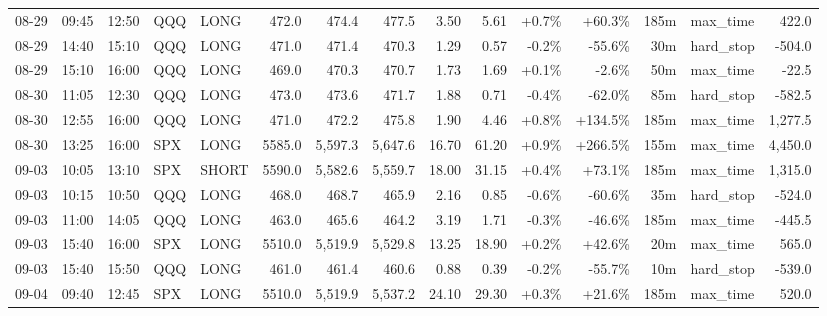 \documentclass[11pt,a4paper,twoside]{article}
\begin{document}
\begin{landscape}
\begin{center}
\begin{longtable}{>{\color{txtmain}}l l l l l r r r r r r r r >{\color{txtmain}}l r}
08-29 & 09:45 & 12:50 & QQQ & LONG & 472.0 & 474.4 & 477.5 & 3.50 & 5.61 & \textcolor{wingreen}{+0.7\%} & \textcolor{wingreen}{+60.3\%} & 185m & max\_time & \textcolor{wingreen}{422.0} \\
08-29 & 14:40 & 15:10 & QQQ & LONG & 471.0 & 471.4 & 470.3 & 1.29 & 0.57 & \textcolor{lossred}{-0.2\%} & \textcolor{lossred}{-55.6\%} & 30m & hard\_stop & \textcolor{lossred}{-504.0} \\
08-29 & 15:10 & 16:00 & QQQ & LONG & 469.0 & 470.3 & 470.7 & 1.73 & 1.69 & \textcolor{wingreen}{+0.1\%} & \textcolor{lossred}{-2.6\%} & 50m & max\_time & \textcolor{lossred}{-22.5} \\
08-30 & 11:05 & 12:30 & QQQ & LONG & 473.0 & 473.6 & 471.7 & 1.88 & 0.71 & \textcolor{lossred}{-0.4\%} & \textcolor{lossred}{-62.0\%} & 85m & hard\_stop & \textcolor{lossred}{-582.5} \\
08-30 & 12:55 & 16:00 & QQQ & LONG & 471.0 & 472.2 & 475.8 & 1.90 & 4.46 & \textcolor{wingreen}{+0.8\%} & \textcolor{wingreen}{+134.5\%} & 185m & max\_time & \textcolor{wingreen}{1,277.5} \\
08-30 & 13:25 & 16:00 & SPX & LONG & 5585.0 & 5,597.3 & 5,647.6 & 16.70 & 61.20 & \textcolor{wingreen}{+0.9\%} & \textcolor{wingreen}{+266.5\%} & 155m & max\_time & \textcolor{wingreen}{4,450.0} \\
09-03 & 10:05 & 13:10 & SPX & SHORT & 5590.0 & 5,582.6 & 5,559.7 & 18.00 & 31.15 & \textcolor{wingreen}{+0.4\%} & \textcolor{wingreen}{+73.1\%} & 185m & max\_time & \textcolor{wingreen}{1,315.0} \\
09-03 & 10:15 & 10:50 & QQQ & LONG & 468.0 & 468.7 & 465.9 & 2.16 & 0.85 & \textcolor{lossred}{-0.6\%} & \textcolor{lossred}{-60.6\%} & 35m & hard\_stop & \textcolor{lossred}{-524.0} \\
09-03 & 11:00 & 14:05 & QQQ & LONG & 463.0 & 465.6 & 464.2 & 3.19 & 1.71 & \textcolor{lossred}{-0.3\%} & \textcolor{lossred}{-46.6\%} & 185m & max\_time & \textcolor{lossred}{-445.5} \\
09-03 & 15:40 & 16:00 & SPX & LONG & 5510.0 & 5,519.9 & 5,529.8 & 13.25 & 18.90 & \textcolor{wingreen}{+0.2\%} & \textcolor{wingreen}{+42.6\%} & 20m & max\_time & \textcolor{wingreen}{565.0} \\
09-03 & 15:40 & 15:50 & QQQ & LONG & 461.0 & 461.4 & 460.6 & 0.88 & 0.39 & \textcolor{lossred}{-0.2\%} & \textcolor{lossred}{-55.7\%} & 10m & hard\_stop & \textcolor{lossred}{-539.0} \\
09-04 & 09:40 & 12:45 & SPX & LONG & 5510.0 & 5,519.9 & 5,537.2 & 24.10 & 29.30 & \textcolor{wingreen}{+0.3\%} & \textcolor{wingreen}{+21.6\%} & 185m & max\_time & \textcolor{wingreen}{520.0} \\

\end{longtable}
\end{center}
\end{landscape}
\end{document}
